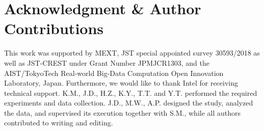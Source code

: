 \section*{Acknowledgment \& Author Contributions}
This work was supported by MEXT, JST special appointed survey 30593/2018 as well as JST-CREST
under Grant Number JPMJCR1303, and the AIST/TokyoTech Real-world Big-Data Computation Open
Innovation Laboratory, Japan.
Furthermore, we would like to thank Intel for receiving technical support.
K.M., J.D., H.Z., K.Y., T.T. and Y.T. performed the required experiments and data collection.
J.D., M.W., A.P. designed the study, analyzed the data, and supervised its execution together
with S.M., while all authors contributed to writing and editing.

